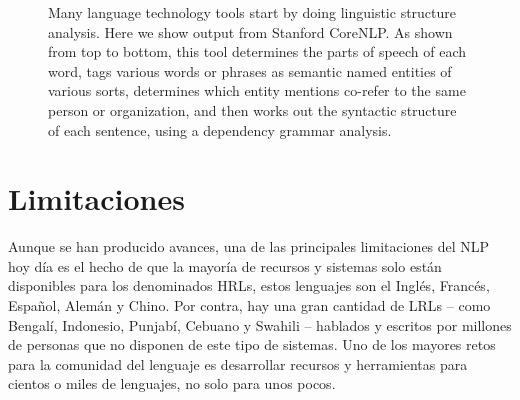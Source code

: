 \begin{figure}[bth]
  \caption[Ejemplo de parseo de dependencias]{Many language technology tools
start by doing linguistic structure analysis. Here we show output from Stanford
CoreNLP. As shown from top to bottom, this tool determines the parts of speech
of each word, tags various words or phrases as semantic named entities of
various sorts, determines which entity mentions co-refer to the same person or
organization, and then works out the syntactic structure of each sentence, using
a dependency grammar analysis.}
  \label{fig:corenlp}
\end{figure}

\section{Limitaciones}
\label{sec:nlplimits}

Aunque se han producido avances, una de las principales limitaciones del
\ac{NLP} hoy día es el hecho de que la mayoría de recursos y sistemas solo están
disponibles para los denominados \acp{HRL}, estos lenguajes son el Inglés, Francés, Español, Alemán y Chino. Por
contra, hay una gran cantidad de \acp{LRL} -- como Bengalí, Indonesio, Punjabí, Cebuano y Swahili -- hablados
y escritos por millones de personas que no disponen de este tipo de
sistemas. Uno de los mayores retos para la comunidad del lenguaje es desarrollar
recursos y herramientas para cientos o miles de lenguajes, no solo para unos
pocos.


